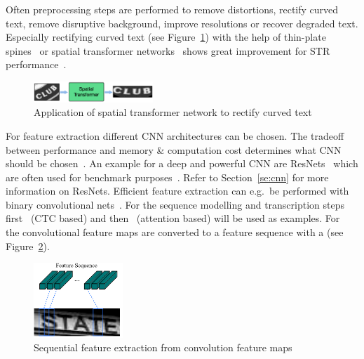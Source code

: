 Often preprocessing steps are performed to remove distortions, rectify curved text,
remove disruptive background, improve resolutions or recover degraded text.
Especially rectifying curved text (see Figure~\ref{fig:STN-application}) with the help of
thin-plate spines~\citep{bookstein_principal_1989} or spatial transformer
networks~\citep{jaderberg_spatial_2015} shows great improvement for \ac{STR}
performance~\citep{long_scene_2021,chen_text_2021}.
\begin{figure}[h]
    \centering
    \includegraphics[width=0.4\textwidth]{img/STN-result-Liu-STAR-2016.png}
    \caption[Text rectification application]{%
        Application of spatial transformer network to rectify curved
        text~\citep{liu_star-net_2016}\label{fig:STN-application}
    }
\end{figure}
For feature extraction different \ac{CNN} architectures can be chosen.
The tradeoff between performance and memory \& computation cost determines what \ac{CNN} should be
chosen~\citep{chen_text_2021}.
An example for a deep and powerful \ac{CNN} are ResNets~\citep{he_deep_2015} which are often used
for benchmark purposes~\citep{chen_text_2021,long_scene_2021}.
Refer to Section~\ref{se:cnn} for more information on ResNets.
Efficient feature extraction can e.g.\ be performed with binary convolutional
nets~\citep{liu_scut-ctw1500_2022}.
For the sequence modelling and transcription steps first~\cite{shi_end--end_2017} (\ac{CTC} based)
and then~\cite{ghosh_visual_2017} (attention based) will be used as examples.
For~\cite{shi_end--end_2017} the convolutional feature maps are converted to a feature sequence
with a (see Figure~\ref{fig:STR-CTC-seq-feat}).
\begin{figure}[h]
    \centering
    \includegraphics[width=0.3\textwidth]{img/STR-encdec-sequence-feat.png}
    \caption[Sequential feature extraction from convolution feature maps]{%
        Sequential feature extraction from convolution feature
        maps~\citep{shi_end--end_2017}\label{fig:STR-CTC-seq-feat}
    }
\end{figure}
